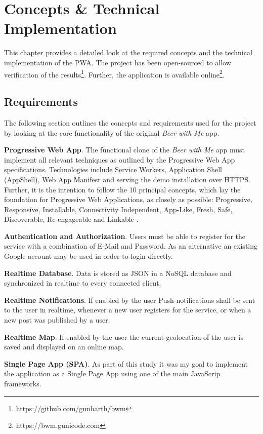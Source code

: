 \chapter{Concepts \& Technical Implementation}
This chapter provides a detailed look at the required concepts and the technical implementation of the PWA. The project has been open-sourced to allow verification of the results\footnote{https://github.com/gunharth/bwm}. Further, the application is available online\footnote{https://bwm.gunicode.com}.

\section{Requirements}

The following section outlines the concepts and requirements used for the project by looking at the core functionality of the original \textit{Beer with Me} app.


\textbf{Progressive Web App}. The functional clone of the \textit{Beer with Me} app must implement all relevant techniques as outlined by the Progressive Web App specifications. Technologies include Service Workers, Application Shell (AppShell), Web App Manifest and serving the demo installation over HTTPS. Further, it is the intention to follow the 10 principal concepts, which lay the foundation for Progressive Web Applications, as closely as possible: Progressive, Responsive, Installable, Connectivity Independent, App-Like, Fresh, Safe, Discoverable, Re-engageable and Linkable \citep{osmaniGettingStartedProgressive2015}.

\textbf{Authentication and Authorization}. Users must be able to register for the service with a combination of E-Mail and Password. As an alternative an existing Google account may be used in order to login directly.

\textbf{Realtime Database}. Data is stored as JSON in a NoSQL database and synchronized in realtime to every connected client.

\textbf{Realtime Notifications}. If enabled by the user Push-notifications shall be sent to the user in realtime, whenever a new user registers for the service, or when a new post was published by a user.

\textbf{Realtime Map}. If enabled by the user the current geolocation of the user is saved and displayed on an online map.

\textbf{Single Page App (SPA)}. As part of this study it was my goal to implement the application as a Single Page App using one of the main JavaScrip frameworks.

